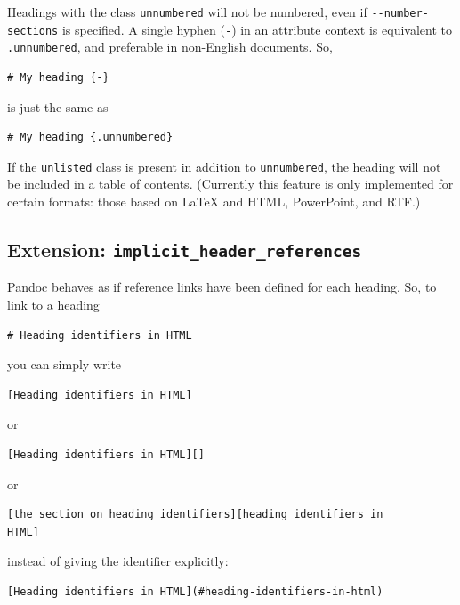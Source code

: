 \documentclass[
  b5paper
]{book}
\begin{document}
Headings with the class \texttt{unnumbered} will not be numbered, even
if \texttt{-\/-number-sections} is specified. A single hyphen
(\texttt{-}) in an attribute context is equivalent to
\texttt{.unnumbered}, and preferable in non-English documents. So,

\begin{verbatim}
# My heading {-}
\end{verbatim}

is just the same as

\begin{verbatim}
# My heading {.unnumbered}
\end{verbatim}

If the \texttt{unlisted} class is present in addition to
\texttt{unnumbered}, the heading will not be included in a table of
contents. (Currently this feature is only implemented for certain
formats: those based on LaTeX and HTML, PowerPoint, and RTF.)

\subsection{\texorpdfstring{Extension:
\texttt{implicit\_header\_references}}{Extension: implicit\_header\_references}}\label{extension-implicit_header_references}

Pandoc behaves as if reference links have been defined for each heading.
So, to link to a heading

\begin{verbatim}
# Heading identifiers in HTML
\end{verbatim}

you can simply write

\begin{verbatim}
[Heading identifiers in HTML]
\end{verbatim}

or

\begin{verbatim}
[Heading identifiers in HTML][]
\end{verbatim}

or

\begin{verbatim}
[the section on heading identifiers][heading identifiers in
HTML]
\end{verbatim}

instead of giving the identifier explicitly:

\begin{verbatim}
[Heading identifiers in HTML](#heading-identifiers-in-html)
\end{verbatim}
\end{document}
